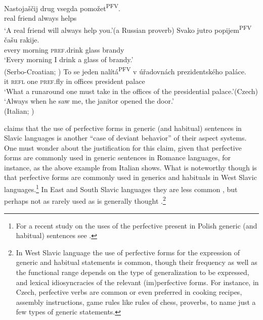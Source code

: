\documentclass[output=paper,colorlinks,citecolor=brown]{langscibook}
\begin{document}
\ea \label{russian}
\ea
\gll Nastojaščij		drug		vsegda	pomožet\textsuperscript{PFV}.\\
real				friend	always	helps \\
\glt `A real friend will always help you.’\hfill (a Russian proverb)
\ex \label{serbo-croatian}
\gll Svako jutro			popijem\textsuperscript{PFV} 	čašu rakije. \\
every morning	\textsc{pref.}drink			glass brandy		\\
\glt `Every morning I drink a glass of brandy.’\\\hfill (Serbo-Croatian; \citealt[62]{monnesland1984})
\ex \label{czech.pf1}
\gll To se jeden nalítá\textsuperscript{PFV} v úřadovnách prezidentského paláce.\\
it \textsc{refl} one \textsc{pref}.fly in offices president palace\\
\glt `What a runaround one must take in the offices of the presidential palace.'\hfill (Czech)
\glt `Always when he saw me, the janitor opened the door.’\\\hfill (Italian; \citealt[508]{Bonomi1997})
\z\z

\noindent
\citet{dahl1995} claims that
the use of perfective forms in generic (and habitual) sentences in Slavic languages is another ``case of deviant behavior'' \citep[420]{dahl1995} of their aspect systems.
One must wonder about the justification for this claim, given
that perfective forms are commonly used in generic sentences in Romance languages, for instance, as the above example from Italian shows. What is noteworthy though is that perfective forms are
commonly used in generics and habituals in West Slavic languages.\footnote{For a recent study on the uses of the perfective present in Polish generic (and habitual) sentences see \citet{wiemer2025}.}
In East and South Slavic languages they are less common \citep{Forsyth1970,fortuin2015typology,wiemer2017diachrony},
but perhaps not as rarely used as is generally thought \citep{wiemer2023}.\footnote{In West Slavic language the use of perfective forms for the expression of  generic and habitual statements is common, though their frequency as well as the functional range depends on the type of generalization to be expressed, and lexical idiosyncracies of the relevant (im)perfective forms. For instance, in Czech, perfective verbs are common or even preferred in cooking recipes, assembly instructions, game rules like rules of chess, proverbs, to name just a few types of generic statements.}
\end{document}
